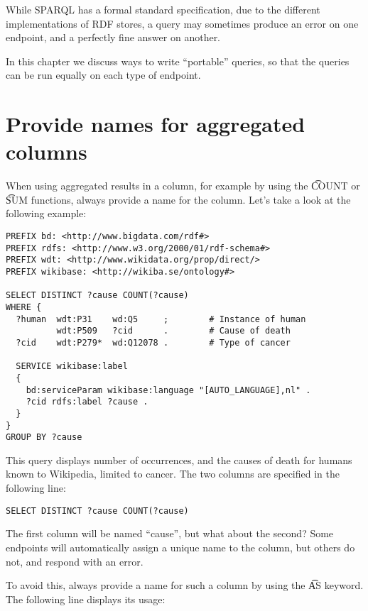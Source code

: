   While SPARQL has a formal standard specification, due to the different
  implementations of RDF stores, a query may sometimes produce an error
  on one endpoint, and a perfectly fine answer on another.

  In this chapter we discuss ways to write ``portable'' queries, so that
  the queries can be run equally on each type of endpoint.

\section{Provide names for aggregated columns}

  When using aggregated results in a column, for example by using the
  \t{COUNT} or \t{SUM} functions, always provide a name for
  the column.  Let's take a look at the following example:

\begin{siderules}
\begin{verbatim}
PREFIX bd: <http://www.bigdata.com/rdf#>
PREFIX rdfs: <http://www.w3.org/2000/01/rdf-schema#>
PREFIX wdt: <http://www.wikidata.org/prop/direct/>
PREFIX wikibase: <http://wikiba.se/ontology#>

SELECT DISTINCT ?cause COUNT(?cause)
WHERE {
  ?human  wdt:P31    wd:Q5     ;        # Instance of human
          wdt:P509   ?cid      .        # Cause of death
  ?cid    wdt:P279*  wd:Q12078 .        # Type of cancer

  SERVICE wikibase:label
  {
    bd:serviceParam wikibase:language "[AUTO_LANGUAGE],nl" .
    ?cid rdfs:label ?cause .
  }
}
GROUP BY ?cause
\end{verbatim}
\end{siderules}

  This query displays number of occurrences, and the causes of
  death for humans known to Wikipedia, limited to cancer.  The two
  columns are specified in the following line:

\begin{siderules}
\begin{verbatim}
SELECT DISTINCT ?cause COUNT(?cause)
\end{verbatim}
\end{siderules}

  The first column will be named ``cause'', but what about the second?
  Some endpoints will automatically assign a unique name to the column,
  but others do not, and respond with an error.

  To avoid this, always provide a name for such a column by using the
  \t{AS} keyword.  The following line displays its usage:

